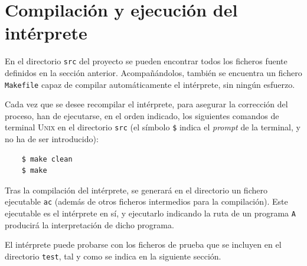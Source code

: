 \documentclass[12pt]{article}
\begin{document}
\section{Compilación y ejecución del intérprete}
En el directorio \texttt{src} del proyecto se pueden encontrar todos los ficheros fuente definidos en la sección anterior. Acompañándolos, también se encuentra un fichero \texttt{Makefile} capaz de compilar automáticamente el intérprete, sin ningún esfuerzo.\par
Cada vez que se desee recompilar el intérprete, para asegurar la corrección del proceso, han de ejecutarse, en el orden indicado, los siguientes comandos de terminal \textsc{Unix} en el directorio \texttt{src} (el símbolo \texttt{\$} indica el \textit{prompt} de la terminal, y no ha de ser introducido):
\begin{verbatim}
    $ make clean
    $ make
\end{verbatim}\par
Tras la compilación del intérprete, se generará en el directorio un fichero ejecutable \texttt{ac} (además de otros ficheros intermedios para la compilación). Este ejecutable es el intérprete en sí, y ejecutarlo indicando la ruta de un programa \texttt{A} producirá la interpretación de dicho programa.\par
El intérprete puede probarse con los ficheros de prueba que se incluyen en el directorio \texttt{test}, tal y como se indica en la siguiente sección.
\end{document}
